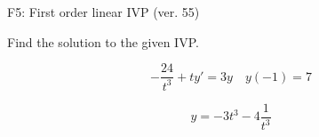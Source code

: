 \begin{exercise}
  \begin{exerciseTitle}F5: First order linear IVP (ver. 55)\end{exerciseTitle}
  \begin{exerciseStatement}
    
Find the solution to the given IVP.

    
\[-\frac{24}{t^{3}} +ty'= 3 y \hspace{1em} y( -1 ) = 7\]

  \end{exerciseStatement}
  \begin{exerciseAnswer}
    
\[y= -3 t^ 3 -4 \frac{1}{t^{3}}\]

  \end{exerciseAnswer}
\end{exercise}